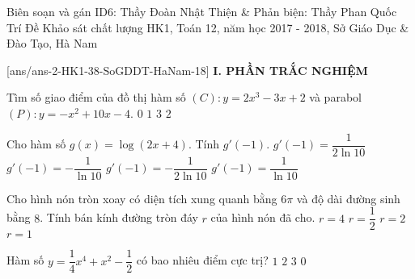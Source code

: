 \begin{name}
	{Biên soạn và gán ID6: Thầy Đoàn Nhật Thiện \& Phản biện: Thầy Phan Quốc Trí}
	{Đề Khảo sát chất lượng HK1, Toán 12, năm học 2017 - 2018, Sở Giáo Dục \& Đào Tạo, Hà Nam}
\end{name}
	\setcounter{ex}{0}\setcounter{bt}{0}
	[ans/ans-2-HK1-38-SoGDDT-HaNam-18]
\noindent\textbf{I. PHẦN TRẮC NGHIỆM}
\begin{ex}
	Tìm số giao điểm của đồ thị hàm số $(C)\colon y=2x^3-3x+2$ và parabol $(P)\colon y=-x^2+10x-4$.
	\choice
	{$0$}
	{$1$}
	{\True $3$}
	{$2$}
\end{ex}
\begin{ex}
	Cho hàm số $g(x)=\log(2x+4)$. Tính $g'(-1)$.
	\choice
	{$g'(-1)=\dfrac{1}{2\ln 10}$}
	{$g'(-1)=-\dfrac{1}{\ln10}$}
	{$g'(-1)=-\dfrac{1}{2\ln10}$}
	{\True $g'(-1)=\dfrac{1}{\ln10}$}
\end{ex}
\begin{ex}
	Cho hình nón tròn xoay có diện tích xung quanh bằng $6\pi$ và độ dài đường sinh bằng $8$. Tính bán kính đường tròn đáy $r$ của hình nón đã cho.
	\choice
	{$r=4$}
	{$r=\dfrac{1}{2}$}
	{\True $r=2$}
	{$r=1$}
\end{ex}
\begin{ex}
	Hàm số $y=\dfrac{1}{4}x^4+x^2-\dfrac{1}{2}$ có bao nhiêu điểm cực trị?
	\choice
	{$1$}
	{$2$}
	{$3$}
	{\True $0$}
\end{ex}
